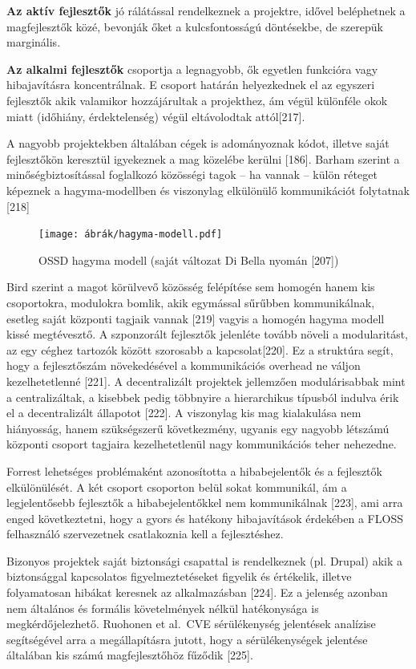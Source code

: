 \documentclass[12pt,magyar,a4paper,oneside]{scrreprt}
\begin{document}
\textbf{Az aktív fejlesztők} jó rálátással rendelkeznek a projektre,
idővel beléphetnek a magfejlesztők közé, bevonják őket a kulcsfontosságú
döntésekbe, de szerepük marginális.

\textbf{Az alkalmi fejlesztők} csoportja a legnagyobb, ők egyetlen
funkcióra vagy hibajavításra koncentrálnak. E csoport határán
helyezkednek el az egyszeri fejlesztők akik valamikor hozzájárultak a
projekthez, ám végül különféle okok miatt (időhiány, érdektelenség)
végül eltávolodtak attól{[}217{]}.

A nagyobb projektekben általában cégek is adományoznak kódot, illetve
saját fejlesztőkön keresztül igyekeznek a mag közelébe kerülni
{[}186{]}. Barham szerint a minőségbiztosítással foglalkozó közösségi
tagok -- ha vannak -- külön réteget képeznek a hagyma-modellben és
viszonylag elkülönülő kommunikációt folytatnak {[}218{]}

\begin{figure}
\hypertarget{fig:HagymaModell}{%
\centering
\texttt{[image: ábrák/hagyma-modell.pdf]}
\caption{OSSD hagyma modell (saját változat Di Bella nyomán
{[}207{]})}\label{fig:HagymaModell}
}
\end{figure}

Bird szerint a magot körülvevő közösség felépítése sem homogén hanem kis
csoportokra, modulokra bomlik, akik egymással sűrűbben kommunikálnak,
esetleg saját központi tagjaik vannak {[}219{]} vagyis a homogén hagyma
modell kissé megtévesztő. A szponzorált fejlesztők jelenléte tovább
növeli a modularitást, az egy céghez tartozók között szorosabb a
kapcsolat{[}220{]}. Ez a struktúra segít, hogy a fejlesztőszám
növekedésével a kommunikációs overhead ne váljon kezelhetetlenné
{[}221{]}. A decentralizált projektek jellemzően modulárisabbak mint a
centralizáltak, a kisebbek pedig többnyire a hierarchikus típusból
indulva érik el a decentralizált állapotot {[}222{]}. A viszonylag kis
mag kialakulása nem hiányosság, hanem szükségszerű következmény, ugyanis
egy nagyobb létszámú központi csoport tagjaira kezelhetetlenül nagy
kommunikációs teher nehezedne.

Forrest lehetséges problémaként azonosította a hibabejelentők és a
fejlesztők elkülönülését. A két csoport csoporton belül sokat
kommunikál, ám a legjelentősebb fejlesztők a hibabejelentőkkel nem
kommunikálnak {[}223{]}, ami arra enged következtetni, hogy a gyors és
hatékony hibajavítások érdekében a FLOSS felhasználó szervezetnek
csatlakoznia kell a fejlesztéshez.

Bizonyos projektek saját biztonsági csapattal is rendelkeznek (pl.
Drupal) akik a biztonsággal kapcsolatos figyelmeztetéseket figyelik és
értékelik, illetve folyamatosan hibákat keresnek az alkalmazásban
{[}224{]}. Ez a jelenség azonban nem általános és formális követelmények
nélkül hatékonysága is megkérdőjelezhető. Ruohonen et al.~CVE
sérülékenység jelentések analízise segítségével arra a megállapításra
jutott, hogy a sérülékenységek jelentése általában kis számú
magfejlesztőhöz fűződik {[}225{]}.
\end{document}
